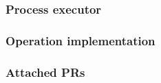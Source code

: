 \documentclass[../main.tex]{subfiles}
\begin{document}
\subsubsection*{Process executor}


\subsubsection*{Operation implementation}


\subsubsection*{Attached PRs}

\end{document}
